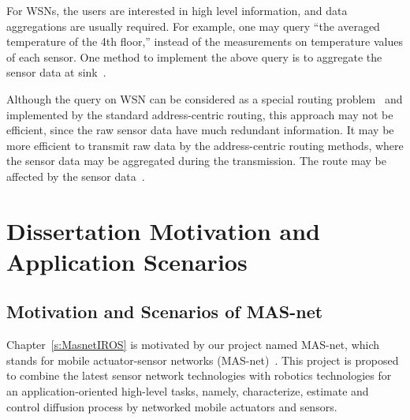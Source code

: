 For WSNs, the users are interested in high level information, and data aggregations are usually required. For example, one may query ``the averaged temperature of the 4th floor,'' instead of the measurements on temperature values of each sensor. One method to implement the above query is to aggregate the sensor data at sink~\cite{GehrkeQueryProc2004}.


Although the query on WSN can be considered as a special routing problem~\cite{madden02design} and implemented by the standard address-centric routing, this approach may not be efficient, since the raw sensor data have much redundant information. It may be more efficient to transmit raw data by the address-centric routing methods, where the sensor data may be aggregated during the transmission. The route may be affected by the sensor data~\cite{Krishnamachari_infocom02}.



\section{Dissertation Motivation and Application Scenarios}
\subsection{Motivation and Scenarios of MAS-net}
        Chapter~\ref{s:MasnetIROS} is motivated by our project named MAS-net, which stands for mobile actuator-sensor networks (MAS-net)~\cite{MooreChen04,MASnetSPIE04ZoneControl,masnetspie04pathplan, ZhongminRobio04, PchenMS, AnishaMS}.
    This project is proposed to combine the latest sensor network technologies with robotics technologies for an application-oriented high-level tasks, namely, characterize, estimate and control diffusion process by networked mobile actuators and sensors.


